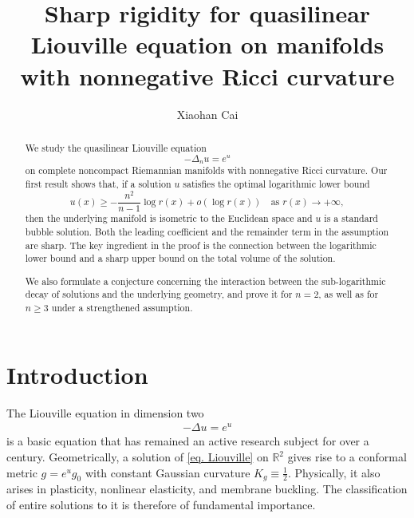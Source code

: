 \documentclass[12pt]{amsart}
\theoremstyle{plain}
\theoremstyle{definition}
\theoremstyle{remark}     %
\begin{document}
\title[Sharp rigidity  for quasilinear Liouville equation on manifolds]
{Sharp rigidity for quasilinear Liouville equation on manifolds with nonnegative Ricci curvature}
\author{Xiaohan Cai}
\address{School of Mathematical Sciences, Shanghai Jiao Tong University, Shanghai 200240, China}

\date{}
\begin{abstract}
We study the quasilinear Liouville equation
\[
-\Delta_n u=e^u
\]
on complete noncompact Riemannian manifolds  with nonnegative Ricci curvature.
Our first  result shows that, if a solution $u$ satisfies the optimal logarithmic lower bound
\[
u(x)\ge -\frac{n^2}{n-1}\log r(x)+o(\log r(x)) \quad \text{as }r(x)\to+\infty,
\]
then the underlying manifold is isometric to the Euclidean space and $u$ is a standard bubble solution. Both the leading coefficient and the remainder term in the assumption are sharp.
The key ingredient in the proof is the connection between the logarithmic lower bound and a sharp upper bound on the total volume of the solution. 

We also formulate a conjecture concerning the interaction between the sub-logarithmic decay of solutions and the underlying geometry, and prove it for $n=2$, as well as for $n\ge 3$ under a strengthened assumption.
\end{abstract}
\maketitle
\section{Introduction}
	The Liouville equation in dimension two
 \begin{align}\label{eq. Liouville}
     -\Delta u=e^{u}
 \end{align}
  is a basic equation that has remained an active research subject for over a century.
 Geometrically, a solution of \cref{eq. Liouville} on $\mathbb{R}^2$ gives rise to a conformal metric $g=e^{u}g_0$ with constant Gaussian curvature $K_g\equiv \frac{1}{2}$.
 Physically, it  also arises in plasticity, nonlinear elasticity, and membrane buckling.
 The classification of entire solutions to it is therefore of fundamental importance.
\end{document}
